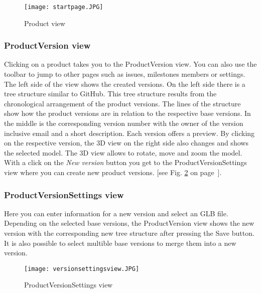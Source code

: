     \begin{figure}[h]
        \centering
        \texttt{[image: startpage.JPG]}
        \caption{Product view}
        \label{fig: startpage}
    \end{figure}

    \subsubsection*{ProductVersion view}
    Clicking on a product takes you to the ProductVersion view. You can also use the toolbar to jump to other pages such as issues, milestones members or settings. The left side of the view shows the created versions. On the left side there is a tree structure similar to GitHub. This tree structure results from the chronological arrangement of the product versions. The lines of the structure show how the product versions are in relation to the respective base versions. In the middle is the corresponding version number with the owner of the version inclusive email and a short description. Each version offers a preview. By clicking on the respective version, the 3D view on the right side also changes and shows the selected model. The 3D view allows to rotate, move and zoom the model. 
    With a click on the \textit{New version} button you get to the ProductVersionSettings view where you can create new product versions. [see Fig. \ref{fig: versionsettingsview} on page~\pageref{fig: versionsettingsview}]. 

    \subsubsection*{ProductVersionSettings view}
    Here you can enter information for a new version and select an GLB file. Depending on the selected base versions, the ProductVersion view shows the new version with the corresponding new tree structure after pressing the Save button. It is also possible to select multible base versions to merge them into a new version.

    \begin{figure}[h]
        \centering
        \texttt{[image: versionsettingsview.JPG]}
        \caption{ProductVersionSettings view}
        \label{fig: versionsettingsview}
    \end{figure}

